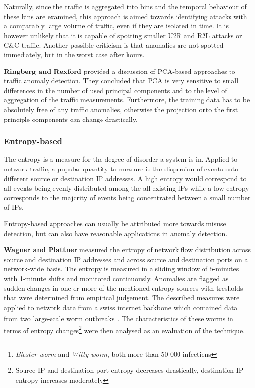 \documentclass[a4paper,12pt,twoside]{report}
\begin{document}
Naturally, since the traffic is aggregated into bins and the temporal behaviour of these bins are examined, this approach is aimed towards identifying attacks with a comparably large volume of traffic, even if they are isolated in time. It is however unlikely that it is capable of spotting smaller U2R and R2L attacks or C\&C traffic. Another possible criticism is that anomalies are not spotted immediately, but in the worst case after hours.


\textbf{Ringberg and Rexford} \cite{ringberg_sensitivity_2007} provided a discussion of PCA-based approaches to traffic anomaly detection. They concluded that PCA is very sensitive to small differences in the number of used principal components and to the level of aggregation of the traffic measurements. Furthermore, the training data has to be absolutely free of any traffic anomalies, otherwise the projection onto the first principle components can change drastically. 

\subsubsection{Entropy-based}

The entropy is a measure for the degree of disorder a system is in. Applied to network traffic, a popular quantity to measure is the dispersion of events onto different source or destination IP addresses. A high entropy would correspond to all events being evenly distributed among the all existing IPs while a low entropy corresponds to the majority of events being concentrated between a small number of IPs. 

Entropy-based approaches can usually be attributed more towards misuse detection, but can also have reasonable applications in anomaly detection.

\textbf{Wagner and Plattner} \cite{wagner2005entropy} measured the entropy of network flow distribution across source and destination IP addresses and across source and destination ports on a network-wide basis. The entropy is measured in a sliding window of 5-minutes with 1-minute shifts and monitored continuously. Anomalies are flagged as sudden changes in one or more of the mentioned entropy sources with tresholds that were determined from empirical judgement. The described measures were applied to network data from a swiss internet backbone which contained data from two large-scale worm outbreaks\footnote{\textit{Blaster worm} and \textit{Witty worm}, both more than 50 000 infections}. The characteristics of these worms in terms of entropy changes\footnote{Source IP and destination port entropy decreases drastically, destination IP entropy increases moderately} were then analysed as an evaluation of the technique.
\end{document}
